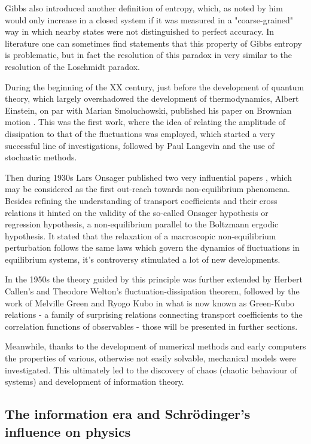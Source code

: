 \documentclass[a4paper,12pt]{article}
\begin{document}
Gibbs also introduced another definition of entropy, which, as noted by him \cite{Gibbs:1928tw} would only increase in a closed system if it was measured in a "coarse-grained" way in which nearby states were not distinguished to perfect accuracy. In literature one can sometimes find statements \cite{Evans:2241458} that this property of Gibbs entropy is problematic, but in fact the resolution of this paradox in very similar to the resolution of the Loschmidt paradox.

During the beginning of the XX century, just before 
the development of quantum theory, which largely overshadowed the development of thermodynamics, Albert Einstein, on par with Marian Smoluchowski, published his paper on Brownian motion \cite{Einstein:eEYNf903}. This was the first work, where the idea of relating the amplitude of dissipation to that of the fluctuations was employed, which started a very successful line of investigations, followed by Paul Langevin and the use of stochastic methods.

Then during 1930s Lars Onsager published two very influential papers \cite{Onsager:zgWBDrcO, Onsager:sJs1Kffm}, which may be considered as the first out-reach towards non-equilibrium phenomena.
Besides refining the understanding of transport coefficients and their cross relations it hinted on the validity of the so-called Onsager hypothesis or regression hypothesis, a non-equilibrium parallel to the Boltzmann ergodic hypothesis. It stated that the relaxation of a macroscopic non-equilibrium perturbation follows the same laws which govern the dynamics of fluctuations in equilibrium systems, it's controversy stimulated a lot of new developments.

In the 1950s the theory guided by this principle was further extended by  Herbert Callen's and Theodore Welton's fluctuation-dissipation theorem, followed by the work of Melville Green and Ryogo Kubo in what is now known as Green-Kubo relations \cite{Kubo:1957cl} - a family of surprising relations connecting transport coefficients to the correlation functions of observables - those will be presented in further sections. 

Meanwhile, thanks to the development of numerical methods and early computers the properties of various, otherwise not easily solvable, mechanical models were investigated.
This ultimately led to the discovery of chaos (chaotic behaviour of systems) and development of information theory.

\subsection{The information era and Schrödinger's influence on physics}
\end{document}

